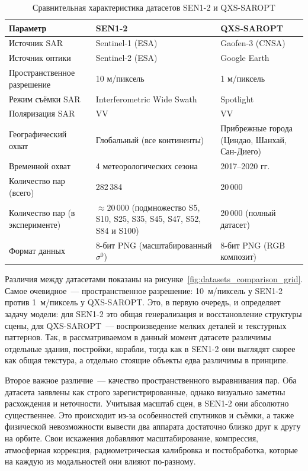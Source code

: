 \begin{table}[!ht]
\centering
\caption{Сравнительная характеристика датасетов SEN1-2 и QXS-SAROPT}
\label{tab:datasets_summary}
\renewcommand{\arraystretch}{1.2}
\begin{tabular}{l p{5.2cm} p{5.2cm}}
\toprule
\textbf{Параметр} & \textbf{SEN1-2} & \textbf{QXS-SAROPT} \\
\midrule
Источник SAR & Sentinel-1 (ESA) & Gaofen-3 (CNSA) \\
Источник оптики & Sentinel-2 (ESA) & Google Earth \\
Пространственное разрешение & 10 м/пиксель & 1 м/пиксель \\
Режим съёмки SAR & Interferometric Wide Swath & Spotlight \\
Поляризация SAR & VV & VV \\
Географический охват & Глобальный (все континенты) & Прибрежные города (Циндао, Шанхай, Сан-Диего) \\
Временной охват & 4 метеорологических сезона & 2017--2020 гг. \\
Количество пар (всего) & 282\,384 & 20\,000 \\
Количество пар (в эксперименте) & $\approx 20\,000$ (подмножество S5, S10, S25, S35, S45, S47, S52, S84 и S100) & 20\,000 (полный датасет) \\
Формат данных & 8-бит PNG (масштабированный $\sigma^0$) & 8-бит PNG (RGB композит) \\
\bottomrule
\end{tabular}
\end{table}

Различия между датасетами показаны на рисунке~\ref{fig:datasets_comparison_grid}.
Самое очевидное~--- пространственное разрешение: 10~м/пиксель у SEN1-2 против 1~м/пиксель у QXS-SAROPT.
Это, в первую очередь, и определяет задачу модели: для SEN1-2 это общая генерализация и восстановление структуры сцены, для QXS-SAROPT~--- воспроизведение мелких деталей и текстурных паттернов.
Так, в рассматриваемом в данный момент датасете различимы отдельные здания, постройки, корабли, тогда как в SEN1-2 они выглядят скорее как общая текстура, а отдельно стоящие объекты едва различимы в принципе.

Второе важное различие~--- качество пространственного выравнивания пар.
Оба датасета заявлены как строго зарегистрированные, однако визуально заметны расхождения и неточности.
Учитывая масштаб сцен, в SEN1-2 они абсолютно существеннее. Это происходит из-за особенностей спутников и съёмки, а также физической невозможности вывести два аппарата достаточно близко друг к другу на орбите.
Свои искажения добавляют масштабирование, компрессия, атмосферная коррекция, радиометрическая калибровка и постобработка, которые на каждую из модальностей они влияют по-разному.

